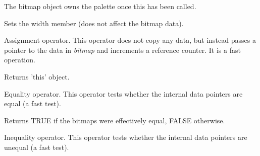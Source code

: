 


The bitmap object owns the palette once this has been called.





Sets the width member (does not affect the bitmap data).





Assignment operator. This operator does not copy any data, but instead
passes a pointer to the data in {\it bitmap} and increments a reference
counter. It is a fast operation.




Returns 'this' object.



Equality operator. This operator tests whether the internal data pointers are
equal (a fast test).




Returns TRUE if the bitmaps were effectively equal, FALSE otherwise.



Inequality operator. This operator tests whether the internal data pointers are
unequal (a fast test).



